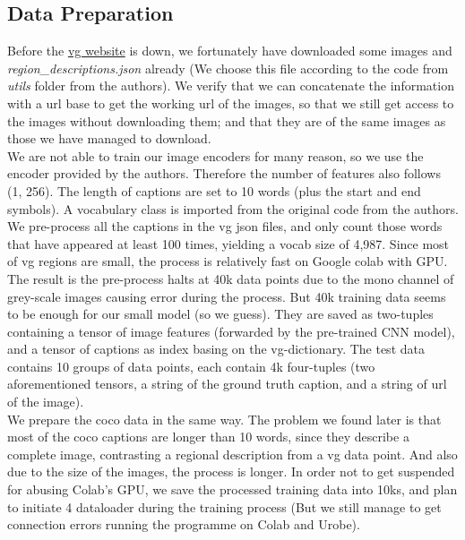 \documentclass[a4paper]{scrartcl}
\begin{document}
\subsection*{Data Preparation}
Before the \href{https://www.visualgenome.org}{vg website} is down, we fortunately have downloaded some images and \emph{region\_descriptions.json} already (We choose this file according to the code from \emph{utils} folder from the authors). We verify that we can concatenate the information with a url base to get the working url of the images, so that we still get access to the images without downloading them; and that they are of the same images as those we have managed to download. \\

We are not able to train our image encoders for many reason, so we use the encoder provided by the authors. Therefore the number of features also follows (1, 256). The length of captions are set to 10 words (plus the start and end symbols). A vocabulary class is imported from the original code from the authors. We pre-process all the captions in the vg json files, and only count those words that have appeared at least 100 times, yielding a vocab size of 4,987. Since most of vg regions are small, the process is relatively fast on Google colab with GPU. \\

The result is the pre-process halts at 40k data points due to the mono channel of grey-scale images causing error during the process. But 40k training data seems to be enough for our small model (so we guess). They are saved as two-tuples containing a tensor of image features (forwarded by the pre-trained CNN model), and a tensor of captions as index basing on the vg-dictionary. The test data contains 10 groups of data points, each contain 4k four-tuples (two aforementioned tensors, a string of the ground truth caption, and a string of url of the image).\\

We prepare the coco data in the same way. The problem we found later is that most of the coco captions are longer than 10 words, since they describe a complete image, contrasting a regional description from a vg data point. And also due to the size of the images, the process is longer. In order not to get suspended for abusing Colab's GPU, we save the processed training data into 10ks, and plan to initiate 4 dataloader during the training process (But we still manage to get connection errors running the programme on Colab and Urobe).  
\end{document}
